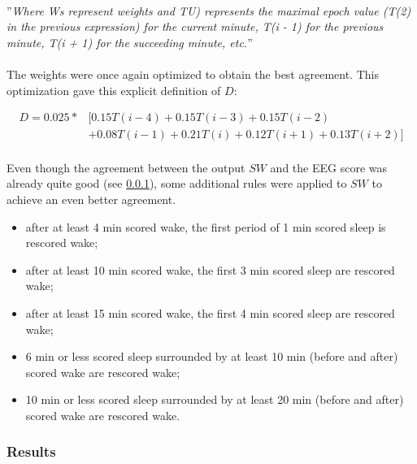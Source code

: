 \documentclass[a4paper,12pt]{article}
\begin{document}
\paragraph{}
''\textit{Where Ws represent weights and TU) represents the maximal epoch value (T(2) in the previous expression) for the current minute, T(i - 1) for the previous minute, T(i + 1) for the succeeding minute, etc.}''\cite{Webster1982}

\paragraph{}
The weights were once again optimized to obtain the best agreement. This optimization gave this explicit definition of $D$:

\begin{equation}
\begin{split}
D = 0.025 * &[0.15 T(i-4) + 0.15 T(i - 3) + 0.15 T(i - 2)\\
         &+ 0.08 T(i - 1) + 0.21 T(i) + 0.12 T(i+1) + 0.13 T(i+2)]
\end{split}
\end{equation}

\paragraph{}
Even though the agreement between the output $SW$ and the EEG score was already quite good (see \ref{subsubsec:websterResults}), some additional rules were applied to $SW$ to achieve an even better agreement.

\begin{itemize}
\item after at least 4 min scored wake, the first period of 1 min scored sleep is rescored wake;
\item after at least 10 min scored wake, the first 3 min scored sleep are rescored wake;
\item after at least 15 min scored wake, the first 4 min scored sleep are rescored wake;
\item 6 min or less scored sleep surrounded by at least 10 min (before and after) scored wake are rescored wake;
\item 10 min or less scored sleep surrounded by at least 20 min (before and after) scored wake are rescored wake.
\end{itemize}

\subsubsection{Results}
\label{subsubsec:websterResults}
\end{document}
